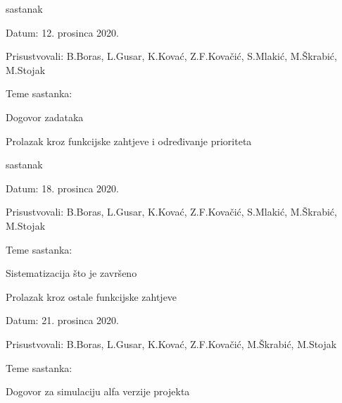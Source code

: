 \begin{packed_enum}
			\item sastanak
			
			\item[] \begin{packed_item}
				\item Datum:  12. prosinca 2020.
				\item Prisustvovali: B.Boras, L.Gusar, K.Kovać, Z.F.Kovačić, S.Mlakić, M.Škrabić, M.Stojak
				\item Teme sastanka:
				\begin{packed_item}
					\item  Dogovor zadataka
					\item  Prolazak kroz funkcijske zahtjeve i određivanje prioriteta\\
				\end{packed_item}
			\end{packed_item}
			
			\item sastanak
			
			\item[] \begin{packed_item}
				\item Datum:  18. prosinca 2020.
				\item Prisustvovali: B.Boras, L.Gusar, K.Kovać, Z.F.Kovačić, S.Mlakić, M.Škrabić, M.Stojak
				\item Teme sastanka:
				\begin{packed_item}
					\item  Sistematizacija što je završeno
					\item  Prolazak kroz ostale funkcijske zahtjeve\\
				\end{packed_item}
			\end{packed_item}
		
			\item[] \begin{packed_item}
				\item Datum:  21. prosinca 2020.
				\item Prisustvovali: B.Boras, L.Gusar, K.Kovać, Z.F.Kovačić,  M.Škrabić, M.Stojak
				\item Teme sastanka:
				\begin{packed_item}
					\item  Dogovor za simulaciju alfa verzije projekta\\
				\end{packed_item}
			\end{packed_item}
		

\end{packed_enum}
